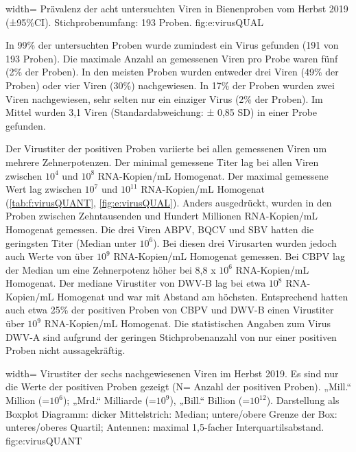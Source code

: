   {width=\textwidth} %
  {Prävalenz der acht untersuchten Viren in Bienenproben vom Herbst 2019 (±95\%CI). Stichprobenumfang: 193 Proben.} %
  {} %
  {fig:e:virusQUAL} %

In 99\% der untersuchten Proben wurde zumindest ein Virus gefunden (191 von 193 Proben). Die maximale Anzahl an gemessenen Viren pro Probe waren fünf (2\% der Proben). In den meisten Proben wurden entweder drei Viren (49\% der Proben) oder vier Viren (30\%) nachgewiesen. In 17\% der Proben wurden zwei Viren nachgewiesen, sehr selten nur ein einziger Virus (2\% der Proben). Im Mittel wurden 3,1 Viren (Standardabweichung: ± 0,85 SD) in einer Probe gefunden.



Der Virustiter der positiven Proben variierte bei allen gemessenen Viren um mehrere Zehnerpotenzen. Der minimal gemessene Titer lag bei allen Viren zwischen $10^4$ und $10^8$ RNA-Kopien/\si{\milli\liter} Homogenat. Der maximal gemessene Wert lag zwischen $10^7$ und $10^{11}$ RNA-Kopien/\si{\milli\liter} Homogenat (\cref{tab:f:virusQUANT}, \cref{fig:e:virusQUAL}). Anders ausgedrückt, wurden in den Proben zwischen Zehntausenden und Hundert Millionen RNA-Kopien/\si{\milli\liter} Homogenat gemessen. Die drei Viren ABPV, BQCV und SBV hatten die geringsten Titer (Median unter $10^6$). Bei diesen drei Virusarten wurden jedoch auch Werte von über $10^9$ RNA-Kopien/\si{\milli\liter} Homogenat gemessen. Bei CBPV lag der Median um eine Zehnerpotenz höher bei 8,8 x $10^6$ RNA-Kopien/\si{\milli\liter} Homogenat. Der mediane Virustiter von DWV-B lag bei etwa $10^8$ RNA-Kopien/\si{\milli\liter} Homogenat und war mit Abstand am höchsten. Entsprechend hatten auch etwa 25\% der positiven Proben von CBPV und DWV-B einen Virustiter über $10^9$ RNA-Kopien/\si{\milli\liter} Homogenat. Die statistischen Angaben zum Virus DWV-A sind aufgrund der geringen Stichprobenanzahl von nur einer positiven Proben nicht aussagekräftig.


  {width=\textwidth} %
  {Virustiter der sechs nachgewiesenen Viren im Herbst 2019. Es sind nur die Werte der positiven Proben gezeigt (N= Anzahl der positiven Proben). „Mill.“ Million (=$10^6$); „Mrd.“ Milliarde (=$10^9$), „Bill.“ Billion (=$10^{12}$). Darstellung als Boxplot Diagramm: dicker Mittelstrich: Median; untere/obere Grenze der Box: unteres/oberes Quartil; Antennen: maximal 1,5-facher Interquartilsabstand.} %
  {} %
  {fig:e:virusQUANT} %


